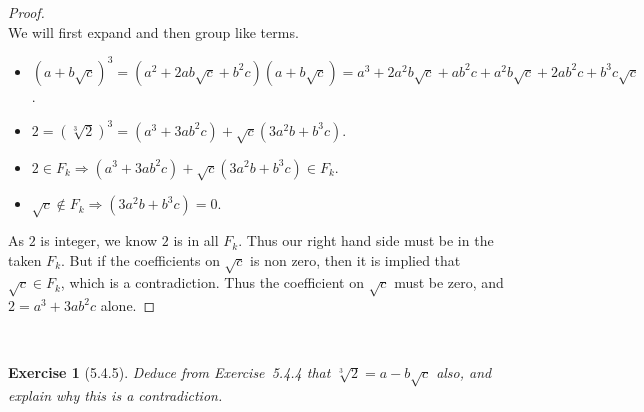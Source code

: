\documentclass[12pt]{article}
\newcommand{\XB}{\color{black}}
\newcommand{\XBB}{\color{blue}}
\newcommand{\ds}{\displaystyle}
\theoremstyle{plain}
\newtheorem{ex}{Exercise}
\begin{document}
\begin{proof}
  \ \\

  We will first expand and then group like terms.

  \begin{itemize}
    \item $ \ds (a + b\sqrt{c})^{3} = (a^{2} + 2ab\sqrt{c} + b^{2}c)(a+b\sqrt{c}) = a^{3} + 2a^{2}b\sqrt{c} + ab^{2}c + a^{2}b\sqrt{c} + 2ab^{2}c + b^{3}c\sqrt{c} $.
    \item $ \ds 2 = (\sqrt[3]{2})^{3} = (a^{3} + 3ab^{2}c) + \sqrt{c}(3a^{2}b + b^{3}c) $.
    \item $ \ds 2 \in F_{k} \Rightarrow (a^{3} + 3ab^{2}c) + \sqrt{c}(3a^{2}b + b^{3}c) \in F_{k} $.
    \item $ \ds \sqrt{c} \notin F_{k} \Rightarrow (3a^{2}b + b^{3}c) = 0 $.
  \end{itemize}

  As $ 2 $ is integer, we know $ 2 $ is in all $ F_{k} $. 
  Thus our right hand side must be in the taken $ F_{k} $. 
  But if the coefficients on $ \sqrt{c} $ is non zero, then it is implied that $ \sqrt{c} \in F_{k} $, which is a contradiction.
  Thus the coefficient on $ \sqrt{c} $ must be zero, and $ 2 = a^{3} + 3ab^{2}c $ alone.

\end{proof}

\newpage

\XBB\hrulefill\XB \\
\begin{ex} [5.4.5]
  Deduce from Exercise~5.4.4 that $ \sqrt[3]{2} = a - b\sqrt{c} $ also, and explain why this is a contradiction.
\end{ex}
\XBB\hrulefill\XB \\
\end{document}
